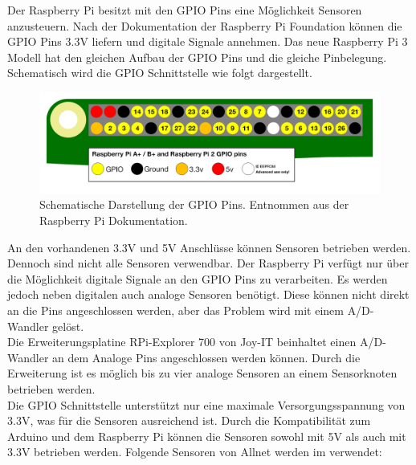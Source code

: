 Der Raspberry Pi besitzt mit den \ac{GPIO} Pins eine Möglichkeit Sensoren anzusteuern. Nach der Dokumentation der Raspberry Pi Foundation\cite{GPIOMode77:online} können die \ac{GPIO} Pins 3.3V liefern und digitale Signale annehmen. Das neue Raspberry Pi 3 Modell hat den gleichen Aufbau der \ac{GPIO} Pins und die gleiche Pinbelegung. Schematisch wird die \ac{GPIO} Schnittstelle wie folgt dargestellt.
\begin{figure}[h]
	\includegraphics[width=\textwidth]{Bilder/Kapitel2/gpio_pins_pi2.png}
	\caption[Schema GPIO Pins]{Schematische Darstellung der GPIO Pins. Entnommen aus der Raspberry Pi Dokumentation\cite{GPIOMode77:online}.}
	\label{fig:Kapitel2/gpio_pins_pi2.png}
\end{figure}
\noindent
An den vorhandenen 3.3V und 5V Anschlüsse können Sensoren betrieben werden. Dennoch sind nicht alle Sensoren verwendbar. Der Raspberry Pi verfügt nur über die Möglichkeit digitale Signale an den \ac{GPIO} Pins zu verarbeiten. Es werden jedoch neben digitalen auch analoge Sensoren benötigt. Diese können nicht direkt an die Pins angeschlossen werden, aber das Problem wird mit einem \ac{A/D-Wandler} gelöst. \\
Die Erweiterungsplatine RPi-Explorer 700 von Joy-IT \cite{joyitrpi87:online} beinhaltet einen \ac{A/D-Wandler} an dem Analoge Pins angeschlossen werden können. Durch die Erweiterung ist es möglich bis zu vier analoge Sensoren an einem Sensorknoten betrieben werden. \\
Die \ac{GPIO} Schnittstelle unterstützt nur eine maximale Versorgungsspannung von 3.3V, was für die Sensoren ausreichend ist. Durch die Kompatibilität zum Arduino und dem Raspberry Pi können die Sensoren sowohl mit 5V als auch mit 3.3V betrieben werden.
Folgende Sensoren von Allnet\cite{111861pd90:online} werden  im  verwendet:
